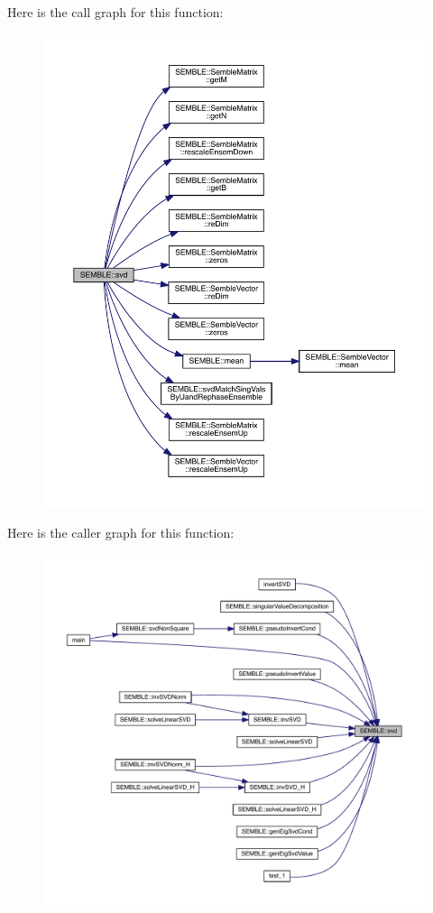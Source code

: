 Here is the call graph for this function\+:
\nopagebreak
\begin{figure}[H]
\begin{center}
\leavevmode
\includegraphics[width=350pt]{d7/dfd/namespaceSEMBLE_acc7fdc62577ac500ca167f9fc7ed8fe9_cgraph}
\end{center}
\end{figure}
Here is the caller graph for this function\+:
\nopagebreak
\begin{figure}[H]
\begin{center}
\leavevmode
\includegraphics[width=350pt]{d7/dfd/namespaceSEMBLE_acc7fdc62577ac500ca167f9fc7ed8fe9_icgraph}
\end{center}
\end{figure}
